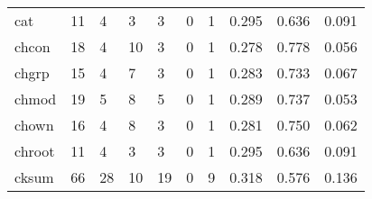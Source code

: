 \begin{longtable}{lp{2.0cm}p{2.0cm}p{2.0cm}p{2.0cm}p{2.0cm}p{2.0cm}p{2.0cm}p{2.0cm}p{2.0cm}}
cat       &                     11 &                                             4 &                                            3 &                                           3 &                                            0 &                                          1 &                                0.295 &                                  0.636 &                                0.091 \\
chcon     &                     18 &                                             4 &                                           10 &                                           3 &                                            0 &                                          1 &                                0.278 &                                  0.778 &                                0.056 \\
chgrp     &                     15 &                                             4 &                                            7 &                                           3 &                                            0 &                                          1 &                                0.283 &                                  0.733 &                                0.067 \\
chmod     &                     19 &                                             5 &                                            8 &                                           5 &                                            0 &                                          1 &                                0.289 &                                  0.737 &                                0.053 \\
chown     &                     16 &                                             4 &                                            8 &                                           3 &                                            0 &                                          1 &                                0.281 &                                  0.750 &                                0.062 \\
chroot    &                     11 &                                             4 &                                            3 &                                           3 &                                            0 &                                          1 &                                0.295 &                                  0.636 &                                0.091 \\
cksum     &                     66 &                                            28 &                                           10 &                                          19 &                                            0 &                                          9 &                                0.318 &                                  0.576 &                                0.136 \\

\end{longtable}
